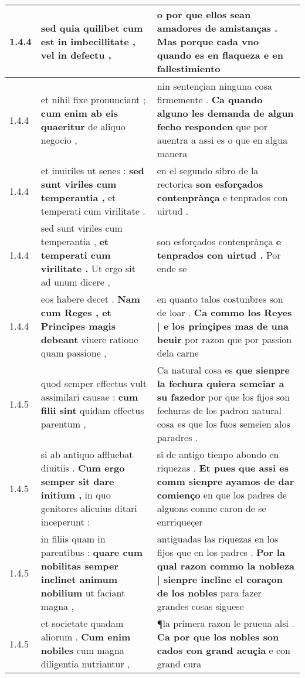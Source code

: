\begin{tabular}{|p{1cm}|p{6.5cm}|p{6.5cm}|}
1.4.4 & sed quia quilibet \textbf{ cum est in imbecillitate , } vel in defectu , & o por que ellos sean amadores de amistanças . \textbf{ Mas porque cada vno quando es en flaqueza } e en fallestimiento \\\hline
1.4.4 & et nihil fixe pronunciant ; \textbf{ cum enim ab eis quaeritur } de aliquo negocio , & nin sentençian ninguna cosa firmemente . \textbf{ Ca quando alguno les demanda de algun fecho responden } que por auentra a assi es o que en algua manera \\\hline
1.4.4 & et inuiriles ut senes : \textbf{ sed sunt viriles cum temperantia , } et temperati cum virilitate . & en el segundo sibro de la rectorica \textbf{ son esforçados contenprànça } e tenprados con uirtud . \\\hline
1.4.4 & sed sunt viriles cum temperantia , \textbf{ et temperati cum virilitate . } Ut ergo sit ad unum dicere , & son esforçados contenprànça \textbf{ e tenprados con uirtud . } Por ende se \\\hline
1.4.4 & eos habere decet . \textbf{ Nam cum Reges , et Principes magis debeant } viuere ratione quam passione , & en quanto talos costunbres son de loar . \textbf{ Ca commo los Reyes | e los prinçipes mas de una beuir } por razon que por passion dela carne \\\hline
1.4.5 & quod semper effectus vult assimilari causae : \textbf{ cum filii sint } quidam effectus parentum , & Ca natural cosa es \textbf{ que sienpre la fechura quiera semeiar a su fazedor } por que los fijos son fechuras de los padron natural cosa es que los fuos semeien alos paradres . \\\hline
1.4.5 & si ab antiquo affluebat diuitiis . \textbf{ Cum ergo semper sit dare initium , } in quo genitores alicuius ditari inceperunt : & si de antigo tienpo abondo en riquezas . \textbf{ Et pues que assi es comm sienpre ayamos de dar comienço } en que los padres de alguons comne caron de se enrriqueçer \\\hline
1.4.5 & in filiis quam in parentibus : \textbf{ quare cum nobilitas semper inclinet animum nobilium } ut faciant magna , & antiguadas las riquezas en los fijos que en los padres . \textbf{ Por la qual razon commo la nobleza | sienpre incline el coraçon de los nobles } para fazer grandes cosas siguese \\\hline
1.4.5 & et societate quadam aliorum . \textbf{ Cum enim nobiles } cum magna diligentia nutriantur , & ¶la primera razon le prueua alsi . \textbf{ Ca por que los nobles son cados con grand acuçia } e con grand cura \\\hline

\end{tabular}
